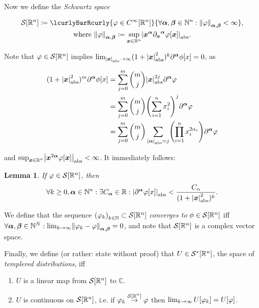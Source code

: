 \documentclass[10pt]{article}
\newtheorem*{lemma}{Lemma}
\DeclarePairedDelimiter\doubleBars{\Vert}{\Vert}
\DeclarePairedDelimiter\singleBars{\lvert}{\rvert}
\DeclarePairedDelimiter\parentheses{\lparen}{\rparen}
\DeclarePairedDelimiter\squareBrackets{[}{]}
\newcommand{\pd}[2]{{\partial_{#1}}^{#2}}
\newcommand{\N}{\mathbb{N}}
\newcommand{\R}{\mathbb{R}}
\newcommand{\C}{\mathbb{C}}
\newcommand{\Cont}{C}
\newcommand{\Continf}{\Cont^\infty}
\newcommand{\SchwartzSpace}{\mathcal{S}}
\newcommand\of[1]{\parentheses*{#1}}
\newcommand\abs[1]{\singleBars*{#1}}
\newcommand{\SchwartzNorm}[3]{\doubleBars*{#3}_{#1,#2}}
\newcommand{\setst}[2]{\lcurlyBarRcurly{#1}{#2}}
\newcommand\gj\varphi
\newcommand{\vx}{{\vectorsym x}}
\newcommand{\miga}{{\vectorsym \alpha}}
\newcommand{\migb}{{\vectorsym \beta}}
\renewcommand\of[1]{\squareBrackets*{#1}}
\renewcommand\abs[1]{\singleBars*{#1}_{\mathrm{abs}}}
\newcommand{\Sum}[1]{\sum\limits_{#1}}
\newcommand{\Rn}{{\R^n}}
\newcommand{\Schwartz}{{\SchwartzSpace\of{\Rn}}}
\begin{document}
  Now we define the \emph{Schwartz space}

  \begin{gather*}
    \Schwartz \coloneqq \setst{\gj \in \Continf\of\Rn}{\forall \miga, \migb \in \N^n: \SchwartzNorm{\miga}{\migb}{\gj} < \infty},\\
    \text{where }\SchwartzNorm{\miga}{\migb}{\gj} \coloneqq \sup_{\vx\in\R^n}\abs{\vx^\miga\pd\vx\miga \gj\of\vx}.
  \end{gather*}

  Note that $\gj \in \Schwartz$ implies $\lim_{\abs{\vx}\rightarrow\infty}(1+\abs{\vx}^2)^k \partial^\miga \phi\of{x} = 0$, as

  \begin{align*}
    (1+\abs{\vx}^2)^m \partial^\miga \phi\of{x} &= \Sum{j = 0}^{m}\binom{m}{j} \abs{\vx}^{2j} \partial^\miga\gj \\
     &= \Sum{j = 0}^m \binom{m}{j} \parentheses*{\Sum{i=1}^{n}x_i^2}^j \partial^\miga\gj \\
     &= \Sum{j = 0}^m \binom{m}{j} \Sum{\abs{\miga} = j}\parentheses*{\prod_{i = 1}^{n} x_i^{2\alpha_i}} \partial^\miga \gj
  \end{align*}

  and $\sup_{\vx \in \Rn}\abs{\vx^{2 \miga} \gj\of\vx}<\infty$. It immediately follows:

  \begin{lemma}
    If $\gj \in \Schwartz$, then
    \begin{equation*}
      \forall k \geq 0, \miga \in \N^n: \exists C_\miga \in \R: \abs{\partial^\miga\gj\of{x}} < \frac{C_\alpha}{(1 + \abs{\vx}^2)^k}.
    \end{equation*}
  \end{lemma}

  We define that the sequence $\parentheses*{\gj_k}_{k \in \N} \subset \Schwartz$ \emph{converges to} $\phi \in \Schwartz$ iff $\forall \miga, \migb \in \N^N: \lim_{k \rightarrow \infty}\SchwartzNorm{\miga}{\migb}{\gj_k - \gj}=0$, and note that $\Schwartz$ is a complex vector space.

  Finally, we define (or rather: state without proof) that $U \in \SchwartzSpace^*\of\Rn$, the space of \emph{templered distributions}, iff

  \begin{enumerate}
    \item $U$ is a linear map from $\Schwartz$ to $\C$.
    \item $U$ is continuous on $\Schwartz$, i.e. if $\gj_k\overset{\Schwartz}{\rightarrow}\gj$ then $\lim_{k\rightarrow\infty}U\of{\gj_k} = U\of\gj$.
  \end{enumerate}
\end{document}
